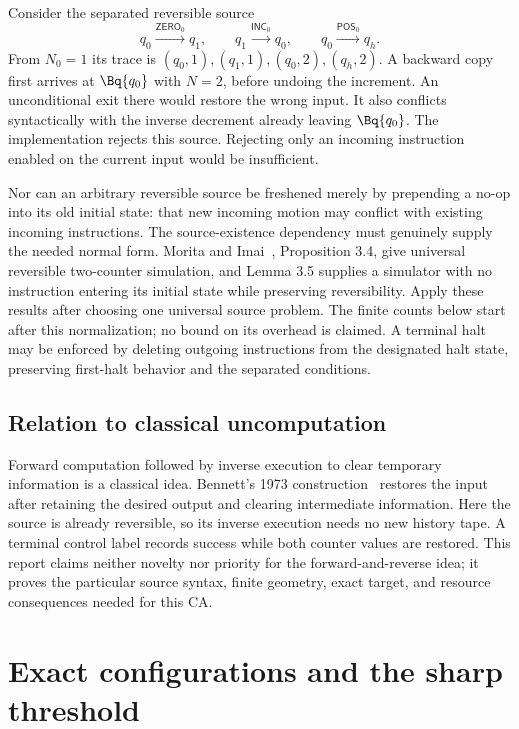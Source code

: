 \documentclass[11pt,letterpaper]{article}
\numberwithin{equation}{section}
\theoremstyle{definition}
\theoremstyle{remark}
\newcommand{\INC}{\mathsf{INC}}\newcommand{\DEC}{\mathsf{DEC}}\newcommand{\NOP}{\mathsf{NOP}}\newcommand{\ZERO}{\mathsf{ZERO}}\newcommand{\POS}{\mathsf{POS}}
\begin{document}
Consider the separated reversible source
\begin{equation}\label{smc:ct:eq:badfresh}
q_0\xrightarrow{\ZERO_0}q_1,\qquad
q_1\xrightarrow{\INC_0}q_0,\qquad
q_0\xrightarrow{\POS_0}q_h.
\end{equation}
From $N_0=1$ its trace is $(q_0,1),(q_1,1),(q_0,2),(q_h,2)$. A backward copy first arrives at $\Bq {q_0}$ with $N=2$, before undoing the increment. An unconditional exit there would restore the wrong input. It also conflicts syntactically with the inverse decrement already leaving $\Bq {q_0}$. The implementation rejects this source. Rejecting only an incoming instruction enabled on the current input would be insufficient.

Nor can an arbitrary reversible source be freshened merely by prepending a no-op into its old initial state: that new incoming motion may conflict with existing incoming instructions. The source-existence dependency must genuinely supply the needed normal form. Morita and Imai~\cite{moritaimai}, Proposition 3.4, give universal reversible two-counter simulation, and Lemma 3.5 supplies a simulator with no instruction entering its initial state while preserving reversibility. Apply these results after choosing one universal source problem. The finite counts below start after this normalization; no bound on its overhead is claimed. A terminal halt may be enforced by deleting outgoing instructions from the designated halt state, preserving first-halt behavior and the separated conditions.

\subsection{Relation to classical uncomputation}

Forward computation followed by inverse execution to clear temporary information is a classical idea. Bennett's 1973 construction~\cite{bennett} restores the input after retaining the desired output and clearing intermediate information. Here the source is already reversible, so its inverse execution needs no new history tape. A terminal control label records success while both counter values are restored. This report claims neither novelty nor priority for the forward-and-reverse idea; it proves the particular source syntax, finite geometry, exact target, and resource consequences needed for this CA.

\section{Exact configurations and the sharp threshold}\label{smc:ct:sec:exact}
\end{document}

